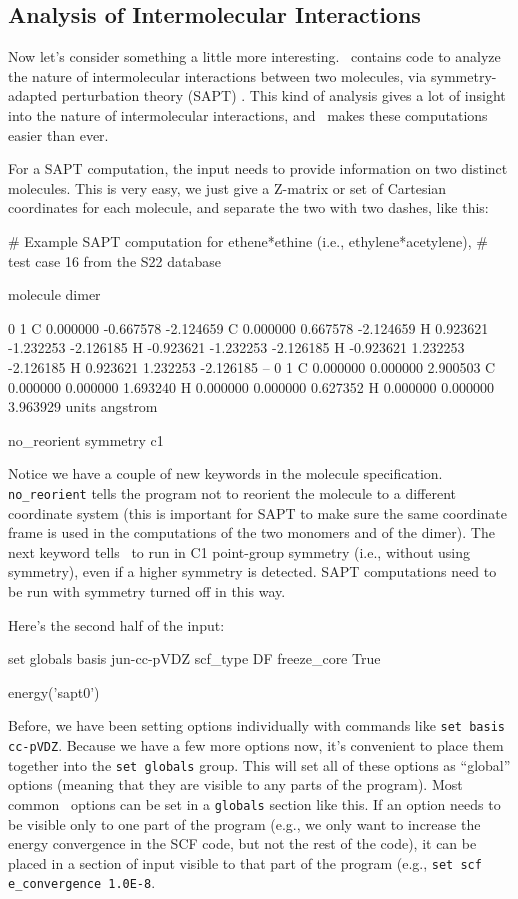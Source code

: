 \subsection{Analysis of Intermolecular Interactions}
Now let's consider something a little more interesting.  \PSIfour\
contains code to analyze the nature of intermolecular interactions
between two molecules, via symmetry-adapted perturbation theory
(SAPT) \cite{Jeziorski:1994:1887}.  This kind of analysis gives a lot
of insight into the nature of intermolecular interactions, and \PSIfour\
makes these computations easier than ever.

For a SAPT computation, the input needs to provide information on two
distinct molecules.  This is very easy, we just give a Z-matrix or set of
Cartesian coordinates for each molecule, and separate the two with two
dashes, like this:
\begin{Snippet}
# Example SAPT computation for ethene*ethine (i.e., ethylene*acetylene),
# test case 16 from the S22 database

molecule dimer {
0 1
C   0.000000  -0.667578  -2.124659
C   0.000000   0.667578  -2.124659
H   0.923621  -1.232253  -2.126185
H  -0.923621  -1.232253  -2.126185
H  -0.923621   1.232253  -2.126185
H   0.923621   1.232253  -2.126185
--
0 1
C   0.000000   0.000000   2.900503
C   0.000000   0.000000   1.693240
H   0.000000   0.000000   0.627352
H   0.000000   0.000000   3.963929
units angstrom

no_reorient
symmetry c1
}
\end{Snippet}

Notice we have a couple of new keywords in the molecule specification.
{\tt no\_reorient} tells the program not to reorient the molecule
to a different coordinate system (this is important for SAPT to make
sure the same coordinate frame is used in the computations of the two
monomers and of the dimer).  The next keyword tells \PSIfour\ to run
in C1 point-group symmetry (i.e., without using symmetry), even if a
higher symmetry is detected.  SAPT computations need to be run with
symmetry turned off in this way.

Here's the second half of the input:
\begin{Snippet}
set globals {
    basis jun-cc-pVDZ
    scf_type DF
    freeze_core True
}

energy('sapt0')
\end{Snippet}

Before, we have been setting options individually with commands like 
{\tt set basis cc-pVDZ}.  Because we have a few more options now, it's
convenient to place them together into the {\tt set globals} group.  This
will set all of these options as ``global'' options (meaning that they are
visible to any parts of the program).  Most common \PSIfour\ options can be
set in a {\tt globals} section like this.  If an option needs to be visible
only to one part of the program (e.g., we only want to increase the
energy convergence in the SCF code, but not the rest of the
code), it can be placed in a section of input visible to that part of the
program (e.g., {\tt set scf e\_convergence 1.0E-8}.

